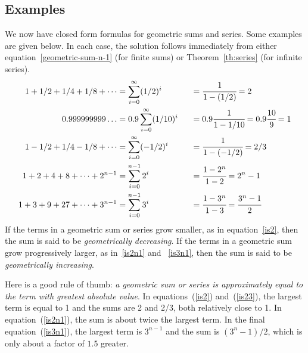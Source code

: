 \begin{staffnotes}

\subsection*{Examples}

We now have closed form formulas for geometric sums and series.  Some
examples are given below.  In each case, the solution follows immediately
from either equation~\eqref{geometric-sum-n-1} (for finite sums) or
Theorem~\ref{th:series} (for infinite series).
\begin{alignat}{3}
1 + 1/2 + 1/4 + 1/8 + \cdots &=\sum_{i=0}^\infty (1/2)^i
                             &\;\;&=\cfrac{1}{1-(1/2)}
                               =2 \label{is2}
\\
0.999999999\dots             &=0.9 \sum_{i=0}^{\infty} (1/10)^i
                             &&=0.9\cfrac{1}{1-1/10}
                               =0.9\cfrac{10}{9} 
                               =1 \label{is1}
\\
1 - 1/2 + 1/4 - 1/8 + \cdots &=\sum_{i=0}^\infty (-1/2)^i
                             &&=\cfrac{1}{1-(-1/2)}
                               =2/3 \label{is23}
\\
1 + 2 + 4 + 8 + \cdots + 2^{n-1} &=\sum_{i=0}^{n-1} 2^i
                                 &&=\cfrac{1 - 2^n}{1 - 2}
                                   =2^n - 1 \label{is2n1}
\\
1 + 3 + 9 + 27 + \cdots + 3^{n-1} &=\sum_{i=0}^{n-1} 3^i
                                  &&=\cfrac{1 - 3^n}{1 - 3}
                                    =\cfrac{3^n - 1}{2} \label{is3n1}
\end{alignat}
If the terms in a geometric sum or series grow smaller, as in
equation~\eqref{is2}, then the sum is said to be {\em geometrically
decreasing}.  If the terms in a geometric sum grow progressively larger,
as in~\eqref{is2n1} and ~\eqref{is3n1}, then the sum is said to be {\em
geometrically increasing}.

Here is a good rule of thumb: {\em a geometric sum or series is
approximately equal to the term with greatest absolute value}.  In
equations~(\ref{is2}) and~(\ref{is23}), the largest term is equal to 1 and
the sums are 2 and 2/3, both relatively close to 1.  In
equation~(\ref{is2n1}), the sum is about twice the largest term.  In the
final equation~(\ref{is3n1}), the largest term is $3^{n-1}$ and the sum is
$(3^n-1)/2$, which is only about a factor of $1.5$ greater.



\end{staffnotes}
